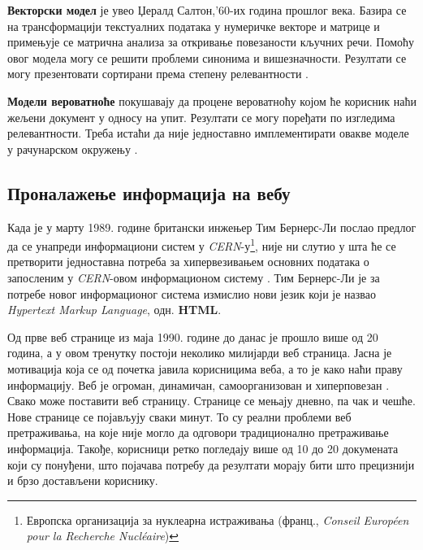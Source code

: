 \textbf{Векторски модел} је увео Џералд Салтон,'60-их
година прошлог века. Базира се на трансформацији текстуалних података у
нумеричке векторе и матрице и примењује се матрична анализа за откривање
повезаности кључних речи. Помоћу овог модела могу се решити проблеми синонима и
вишезначности. Резултати се могу презентовати сортирани према степену
релевантности \cite{berry2005understanding}.

\textbf{Модели вероватноће} покушавају да процене
вероватноћу којом ће корисник наћи жељени документ у односу на упит. Резултати
се могу поређати по изгледима релевантности. Треба истаћи да није једноставно
имплементирати овакве моделе у рачунарском окружењу
\cite{berry2005understanding}.

\subsection{Проналажење информација на вебу}
Када је у марту 1989. године британски инжењер Тим Бернерс-Ли послао предлог \cite{proposal} да се унапреди информациони систем у \emph{CERN}-у\footnote{Европска организација за нуклеарна истраживања (франц., \emph{Conseil Européen pour la Recherche Nucléaire})}, није ни слутио у шта ће се претворити једноставна потреба за хипервезивањем основних података о запосленим у \emph{CERN}-овом информационом систему \cite{berners2004weaving}. Тим Бернерс-Ли је за потребе новог информационог система измислио нови језик који је назвао \emph{Hypertext Markup Language}, одн. \textbf{HTML}.

Од прве веб странице из маја 1990. године до данас је прошло више од 20 година,
а у овом тренутку постоји неколико милијарди веб страница. Јасна је мотивација
која се од почетка јавила корисницима веба, а то је како наћи праву информацију.
Веб је огроман, динамичан, самоорганизован и хиперповезан
\cite[Ch 1.3.1]{langville2011google}. Свако може поставити веб
страницу. Странице се мењају дневно, па
чак и чешће. Нове странице се појављују сваки минут. То су реални проблеми веб
претраживања, на које није могло да одговори традиционално претраживање
информација. Такође, корисници ретко погледају више од 10 до 20 докумената који
су понуђени, што појачава потребу да резултати морају бити што прецизнији и брзо достављени кориснику.

